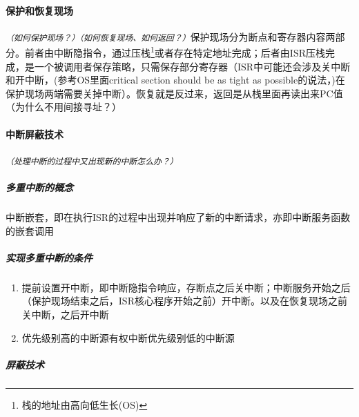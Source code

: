 \documentclass[]{report}
\begin{document}
		\paragraph{保护和恢复现场}\texttt{\textit{（如何保护现场？）（如何恢复现场、如何返回？）}}保护现场分为断点和寄存器内容两部分。前者由中断隐指令，通过压栈\footnote{栈的地址由高向低生长(OS)}或者存在特定地址完成；后者由ISR压栈完成，是一个被调用者保存策略，只需保存部分寄存器（ISR中可能还会涉及关中断和开中断，(参考OS里面critical section should be as tight as possible的说法，)在保护现场两端需要关掉中断）。恢复就是反过来，返回是从栈里面再读出来PC值（为什么不用间接寻址？）
		\paragraph{中断屏蔽技术}\texttt{\textit{（处理中断的过程中又出现新的中断怎么办？）}}
		\subparagraph{多重中断的概念} 中断嵌套，即在执行ISR的过程中出现并响应了新的中断请求，亦即中断服务函数的嵌套调用
		\subparagraph{实现多重中断的条件}
		\begin{enumerate}
			\item 提前设置开中断，即中断隐指令响应，存断点之后关中断；中断服务开始之后（保护现场结束之后，ISR核心程序开始之前）开中断。以及在恢复现场之前关中断，之后开中断
			\item 优先级别高的中断源有权中断优先级别低的中断源
		\end{enumerate}
		\subparagraph{屏蔽技术}
\end{document}

